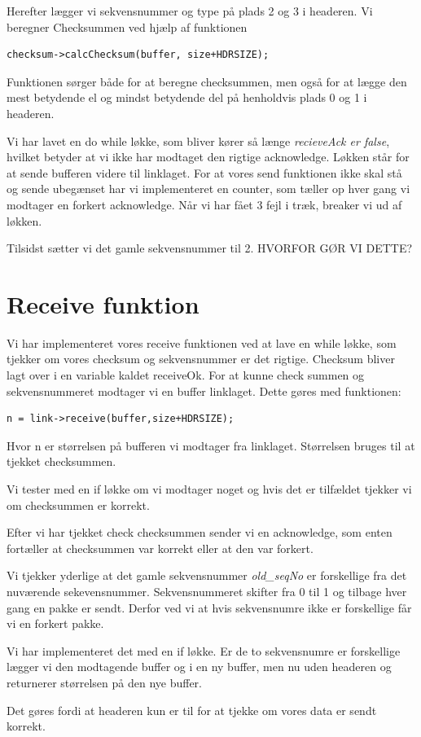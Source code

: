 Herefter lægger vi sekvensnummer og type på plads 2 og 3 i headeren. 
Vi beregner Checksummen ved hjælp af funktionen 
\begin{lstlisting}
checksum->calcChecksum(buffer, size+HDRSIZE);
\end{lstlisting}
Funktionen sørger både for at beregne checksummen, men også for at lægge den mest betydende el og mindst betydende del på henholdvis plads 0 og 1 i headeren.

Vi har lavet en do while løkke, som bliver kører så længe \textit{recieveAck er false}, hvilket betyder at vi ikke har modtaget den rigtige acknowledge. Løkken står for at sende bufferen videre til linklaget. 
For at vores send funktionen ikke skal stå og sende ubegænset har vi implementeret en counter, som tæller op hver gang vi modtager en forkert acknowledge. Når vi har fået 3 fejl i træk, breaker vi ud af løkken. 

Tilsidst sætter vi det gamle sekvensnummer til 2. 
HVORFOR GØR VI DETTE?

\section{Receive funktion}

Vi har implementeret vores receive funktionen ved at lave en while løkke, som tjekker om vores checksum og sekvensnummer er det rigtige. 
Checksum bliver lagt over i en variable kaldet receiveOk. 
For at kunne check summen og sekvensnummeret modtager vi en buffer linklaget. 
Dette gøres med funktionen: 
\begin{lstlisting}
n = link->receive(buffer,size+HDRSIZE);
\end{lstlisting}
Hvor n er størrelsen på bufferen vi modtager fra linklaget. Størrelsen bruges til at tjekket checksummen. 

Vi tester med en if løkke om vi modtager noget og hvis det er tilfældet tjekker vi om checksummen er korrekt. 

Efter vi har tjekket check checksummen sender vi en acknowledge, som enten fortæller at checksummen var korrekt eller at den var forkert. 

Vi tjekker yderlige at det gamle sekvensnummer \textit{old\_seqNo} er forskellige fra det nuværende sekevensnummer. Sekvensnummeret skifter fra 0 til 1 og tilbage hver gang en pakke er sendt. Derfor ved vi at hvis sekvensnumre ikke er forskellige får vi en forkert pakke.  

Vi har implementeret det med en if løkke. 
Er de to sekvensnumre er forskellige lægger vi den modtagende buffer og i en ny buffer, men nu uden headeren og returnerer størrelsen på den nye buffer.

Det gøres fordi at headeren kun er til for at tjekke om vores data er sendt korrekt.  
